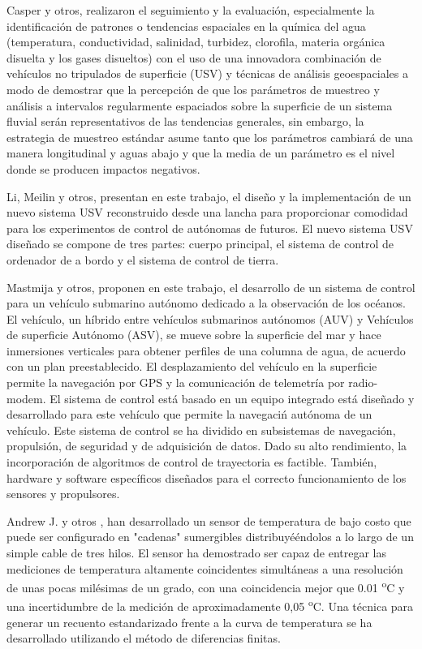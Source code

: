 Casper y otros\cite{casper2007combining}, realizaron el seguimiento y la evaluaci\'on, especialmente la identificaci\'on de patrones o tendencias espaciales en la qu\'imica del agua (temperatura, conductividad, salinidad, turbidez, clorofila, materia org\'anica disuelta y los gases disueltos) con el uso de una innovadora combinaci\'on de veh\'iculos no tripulados de superficie (USV) y t\'ecnicas de an\'alisis geoespaciales a modo de demostrar que la percepci\'on de que los par\'ametros de muestreo y an\'alisis a intervalos regularmente espaciados sobre la superficie de un sistema fluvial ser\'an representativos de las tendencias generales, sin embargo, la estrategia de muestreo est\'andar asume tanto que los par\'ametros cambiar\'a de una manera longitudinal y aguas abajo y que la media de un par\'ametro es el nivel donde se producen impactos negativos. 

Li, Meilin y otros\cite{li2012design}, presentan en este trabajo, el dise\~no y la implementaci\'on de un nuevo sistema USV reconstruido desde una lancha para proporcionar comodidad para los experimentos de control de aut\'onomas de futuros. El nuevo sistema USV dise\~nado se compone de tres partes: cuerpo principal, el sistema de control de ordenador de a bordo y el sistema de control de tierra. 

 Mastmija y otros\cite{masmitja2010development}, proponen en este trabajo, el desarrollo de un sistema de control para un veh\'iculo submarino autónomo dedicado a la observaci\'on de los oc\'eanos. El veh\'iculo, un h\'ibrido entre veh\'iculos submarinos aut\'onomos (AUV) y Veh\'iculos de superficie Aut\'onomo (ASV), se mueve sobre la superficie del mar y hace inmersiones verticales para obtener perfiles de una columna de agua, de acuerdo con un plan preestablecido. El desplazamiento del veh\'iculo en la superficie permite la navegaci\'on por GPS y la comunicaci\'on de telemetr\'ia por radio-modem. El sistema de control est\'a basado en un equipo integrado est\'a dise\~nado y desarrollado para este veh\'iculo que permite la navegaci\'n aut\'onoma de un veh\'iculo. Este sistema de control se ha dividido en subsistemas de navegaci\'on, propulsi\'on, de seguridad y de adquisici\'on de datos. Dado su alto rendimiento, la incorporaci\'on de algoritmos de control de trayectoria es factible. Tambi\'en, hardware y software espec\'ificos dise\~nados para el correcto funcionamiento de los sensores y propulsores.

Andrew J. y otros \cite{skinner2006using}, han desarrollado un sensor de temperatura de bajo costo que puede ser configurado en "cadenas" sumergibles distribuyé\'endolos a lo largo de un simple cable de tres hilos. El sensor ha demostrado ser capaz de entregar las mediciones de temperatura altamente coincidentes simult\'aneas a una resoluci\'on de unas pocas mil\'esimas de un grado, con una coincidencia mejor que 0.01  \textsuperscript{o}C y una incertidumbre de la medici\'on de aproximadamente 0,05  \textsuperscript{o}C. Una t\'ecnica para generar un recuento estandarizado frente a la curva de temperatura se ha desarrollado utilizando el m\'etodo de diferencias finitas.

